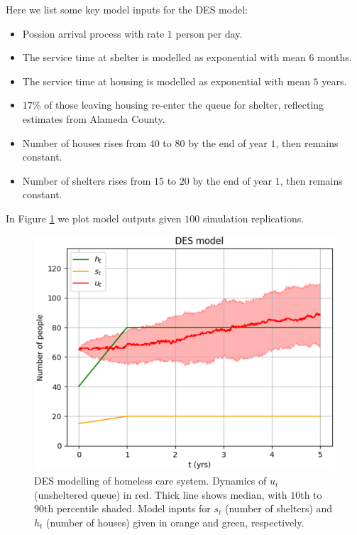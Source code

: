 \documentclass[12pt,a4paper]{article}
\begin{document}
Here we list some key model inputs for the DES model:
%
\begin{itemize} [noitemsep]
\item Possion arrival process with rate $1$ person per day.
\item The service time at shelter is modelled as exponential with mean $6$ months.
\item The service time at housing is modelled as exponential with mean $5$ years.
\item $17\%$ of those leaving housing re-enter the queue for shelter, reflecting estimates from Alameda County.
\item Number of houses rises from $40$ to $80$ by the end of year $1$, then remains constant.
\item Number of shelters rises from $15$ to $20$ by the end of year $1$, then remains constant.
\end{itemize}
%
In Figure \ref{fig:ut-illustrative} we plot model outputs given $100$ simulation replications. 
\begin{figure}[h!]%
    \centering
    \includegraphics[scale=0.45]{example_output.png}
    \caption{DES modelling of homeless care system. Dynamics of $u_t$ (unsheltered queue) in red. Thick line shows median, with $10$th to $90$th percentile shaded. Model inputs for $s_t$ (number of shelters) and $h_t$ (number of houses) given in orange and green, respectively.}
    \label{fig:ut-illustrative}
\end{figure}
%


\end{document}
